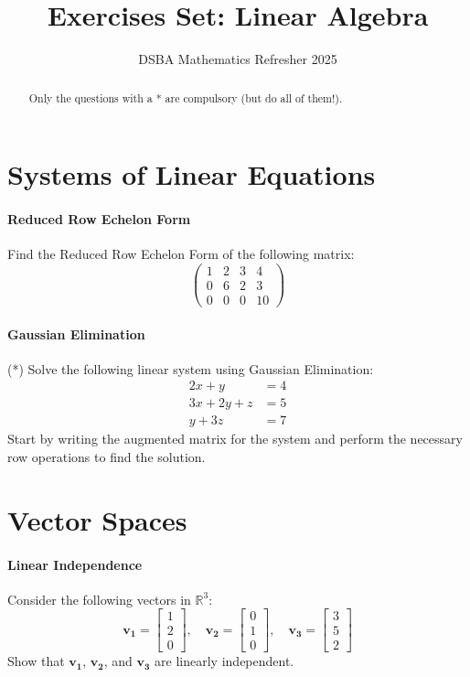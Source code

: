 \documentclass[]{article}
\title{Exercises Set: Linear Algebra}
\author{DSBA Mathematics Refresher 2025}
\date{}
\begin{document}
	
	\maketitle
	
	\begin{abstract}
		Only the questions with a * are compulsory (but do all of them!).
	\end{abstract}
	
	\section{Systems of Linear Equations}
	\paragraph{Reduced Row Echelon Form}
	Find the Reduced Row Echelon Form of the following matrix:
	$$\begin{pmatrix}
		1 & 2 & 3 & 4\\
		0 & 6 & 2 & 3\\
		0 & 0 & 0 & 10
	\end{pmatrix}$$
	
	\paragraph{Gaussian Elimination}
	(*) Solve the following linear system using Gaussian Elimination:
	\begin{align*}
		2x + y &= 4 \\
		3x + 2y + z &= 5 \\
		y + 3z &= 7
	\end{align*}
	Start by writing the augmented matrix for the system and perform the necessary row operations to find the solution.
	
	
	\section{Vector Spaces}
	\paragraph{Linear Independence}
	Consider the following vectors in $\mathbb{R}^3$:
	$$
	\mathbf{v_1} = \begin{bmatrix}
		1 \\
		2 \\
		0
	\end{bmatrix}, \quad
	\mathbf{v_2} = \begin{bmatrix}
		0 \\
		1 \\
		0
	\end{bmatrix}, \quad
	\mathbf{v_3} = \begin{bmatrix}
		3 \\
		5 \\
		2
	\end{bmatrix}
	$$
	Show that $\mathbf{v_1}$, $\mathbf{v_2}$, and $\mathbf{v_3}$ are linearly independent.
	
\end{document}
